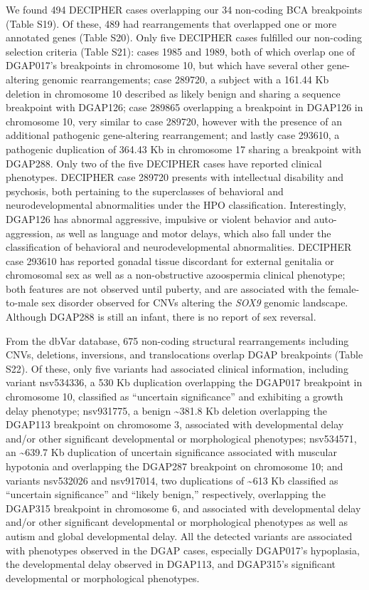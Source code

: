 \documentclass[a4paper,twoside=true,openright,parskip=full,chapterprefix=true,11pt,headings=normal,bibliography=totoc,listof=totoc,titlepage=on,captions=tableabove,draft=false]{scrreprt}
\theoremstyle{definition}
\theoremstyle{definition}
\theoremstyle{definition}
\theoremstyle{remark}
\begin{document}
We found 494 DECIPHER cases overlapping our 34 non-coding BCA
breakpoints (Table S19). Of these, 489 had rearrangements that
overlapped one or more annotated genes (Table S20). Only five DECIPHER
cases fulfilled our non-coding selection criteria (Table S21): cases
1985 and 1989, both of which overlap one of DGAP017's breakpoints in
chromosome 10, but which have several other gene-altering genomic
rearrangements; case 289720, a subject with a 161.44 Kb deletion in
chromosome 10 described as likely benign and sharing a sequence
breakpoint with DGAP126; case 289865 overlapping a breakpoint in DGAP126
in chromosome 10, very similar to case 289720, however with the presence
of an additional pathogenic gene-altering rearrangement; and lastly case
293610, a pathogenic duplication of 364.43 Kb in chromosome 17 sharing a
breakpoint with DGAP288. Only two of the five DECIPHER cases have
reported clinical phenotypes. DECIPHER case 289720 presents with
intellectual disability and psychosis, both pertaining to the
superclasses of behavioral and neurodevelopmental abnormalities under
the HPO classification. Interestingly, DGAP126 has abnormal aggressive,
impulsive or violent behavior and auto-aggression, as well as language
and motor delays, which also fall under the classification of behavioral
and neurodevelopmental abnormalities. DECIPHER case 293610 has reported
gonadal tissue discordant for external genitalia or chromosomal sex as
well as a non-obstructive azoospermia clinical
phenotype;\citep{Vetro2015} both features are not observed until
puberty, and are associated with the female-to-male sex disorder
observed for CNVs altering the \emph{SOX9} genomic landscape. Although
DGAP288 is still an infant, there is no report of sex reversal.

From the dbVar database, 675 non-coding structural rearrangements
including CNVs, deletions, inversions, and translocations overlap DGAP
breakpoints (Table S22). Of these, only five variants had associated
clinical information, including variant nsv534336, a 530 Kb duplication
overlapping the DGAP017 breakpoint in chromosome 10, classified as
``uncertain significance''\citep{Miller2010} and exhibiting a growth
delay phenotype; nsv931775, a benign \textasciitilde{}381.8 Kb deletion
overlapping the DGAP113 breakpoint on chromosome 3, associated with
developmental delay and/or other significant developmental or
morphological phenotypes;\citep{Miller2010} nsv534571, an
\textasciitilde{}639.7 Kb duplication of uncertain significance
associated with muscular hypotonia and overlapping the DGAP287
breakpoint on chromosome 10; and variants nsv532026 and nsv917014, two
duplications of \textasciitilde{}613 Kb classified as ``uncertain
significance'' and ``likely benign,'' respectively, overlapping the
DGAP315 breakpoint in chromosome 6, and associated with developmental
delay and/or other significant developmental or morphological phenotypes
as well as autism and global developmental delay. All the detected
variants are associated with phenotypes observed in the DGAP cases,
especially DGAP017's hypoplasia, the developmental delay observed in
DGAP113, and DGAP315's significant developmental or morphological
phenotypes.
\end{document}
